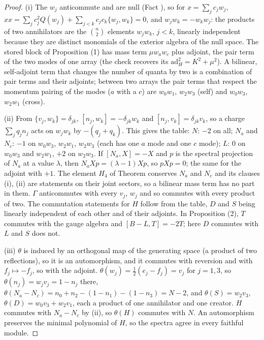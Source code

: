 \begin{proof}
(i) The $w_{j}$ anticommute and are null (Fact ), so for $x = \sum_{j}c_{j}w_{j}$, $xx = \sum_{j}c_{j}^{2}Q(w_{j}) + \sum_{j<k}c_{j}c_{k}\{w_{j}, w_{k}\} = 0$, and $w_{j}w_{k} = -w_{k}w_{j}$: the products of two annihilators are the $\binom{n}{2}$ elements $w_{j}w_{k}$, $j < k$, linearly independent because they are distinct monomials of the exterior algebra of the null space. The stored block of Proposition (1) has mass term $\mu w_{a}w_{c}$ plus adjoint, the pair term of the two modes of one array (the check recovers its $\mathrm{ad}_{H}^{2} = K^{2} + \mu^{2}$). A bilinear, self-adjoint term that changes the number of quanta by two is a combination of pair terms and their adjoints; between two arrays the pair terms that respect the momentum pairing of the modes ($a$ with a $c$) are $w_{0}w_{1}$, $w_{2}w_{3}$ (self) and $w_{0}w_{3}$, $w_{2}w_{1}$ (cross).

(ii) From $\{v_{j}, w_{k}\} = \delta_{jk}$, $[n_{j}, w_{k}] = -\delta_{jk}w_{k}$ and $[n_{j}, v_{k}] = \delta_{jk}v_{k}$, so a charge $\sum_{j}q_{j}n_{j}$ acts on $w_{j}w_{k}$ by $-(q_{j} + q_{k})$. This gives the table: $N$: $-2$ on all; $N_{a}$ and $N_{c}$: $-1$ on $w_{0}w_{3}$, $w_{2}w_{1}$, $w_{2}w_{3}$ (each has one $a$ mode and one $c$ mode); $L$: $0$ on $w_{0}w_{3}$ and $w_{2}w_{1}$, $+2$ on $w_{2}w_{3}$. If $[N_{a}, X] = -X$ and $p$ is the spectral projection of $N_{a}$ at a value $\lambda$, then $N_{a}Xp = (\lambda - 1)Xp$, so $pXp = 0$; the same for the adjoint with $+1$. The element $H_{4}$ of Theorem  conserves $N_{a}$ and $N_{c}$ and its clauses (i), (ii) are statements on their joint sectors, so a bilinear mass term has no part in them. $\Gamma$ anticommutes with every $v_{j}$, $w_{j}$ and so commutes with every product of two. The commutation statements for $H$ follow from the table, $D$ and $S$ being linearly independent of each other and of their adjoints. In Proposition (2), $T$ commutes with the gauge algebra and $[B - L, T] = -2T$; here $D$ commutes with $L$ and $S$ does not.

(iii) $\theta$ is induced by an orthogonal map of the generating space (a product of two reflections), so it is an automorphism, and it commutes with reversion and with $f_{j} \mapsto -f_{j}$, so with the adjoint. $\theta(w_{j}) = \tfrac12(e_{j} - f_{j}) = v_{j}$ for $j = 1, 3$, so $\theta(n_{j}) = w_{j}v_{j} = 1 - n_{j}$ there, $\theta(N_{a} - N_{c}) = n_{0} + n_{2} - (1 - n_{1}) - (1 - n_{3}) = N - 2$, and $\theta(S) = w_{2}v_{3}$, $\theta(D) = w_{0}v_{3} + w_{2}v_{1}$, each a product of one annihilator and one creator. $H$ commutes with $N_{a} - N_{c}$ by (ii), so $\theta(H)$ commutes with $N$. An automorphism preserves the minimal polynomial of $H$, so the spectra agree in every faithful module.


\end{proof}
